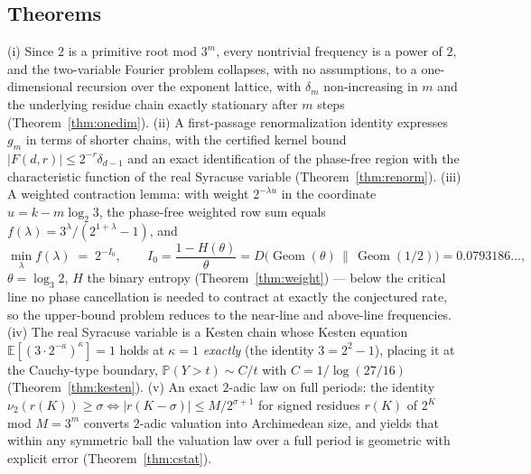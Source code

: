 \documentclass[11pt]{article}
\theoremstyle{definition}
\DeclareMathOperator{\Geom}{Geom}
\newcommand{\E}{\mathbb{E}}
\newcommand{\Prob}{\mathbb{P}}
\begin{document}
\subsection*{Theorems} (i) Since $2$ is a primitive root mod $3^m$, every
nontrivial frequency is a power of $2$, and the two-variable Fourier
problem collapses, with no assumptions, to a one-dimensional recursion
over the exponent lattice, with $\delta_m$ non-increasing in $m$ and the
underlying residue chain exactly stationary after $m$ steps
(Theorem~\ref{thm:onedim}). (ii) A first-passage renormalization identity
expresses $g_m$ in terms of shorter chains, with the certified kernel
bound $|F(d,r)|\le 2^{-r}\delta_{d-1}$ and an exact identification of the
phase-free region with the characteristic function of the real Syracuse
variable (Theorem~\ref{thm:renorm}). (iii) A weighted contraction lemma:
with weight $2^{-\lambda u}$ in the coordinate $u=k-m\log_2 3$, the
phase-free weighted row sum equals $f(\lambda)=3^{\lambda}/(2^{1+\lambda}-1)$,
and
\[
\min_{\lambda}f(\lambda)\;=\;2^{-I_0},\qquad
I_0=\frac{1-H(\theta)}{\theta}=D\bigl(\Geom(\theta)\,\|\,\Geom(1/2)\bigr)
=0.0793186\ldots,
\]
$\theta=\log_3 2$, $H$ the binary entropy (Theorem~\ref{thm:weight}) ---
below the critical line no phase cancellation is needed to contract at
exactly the conjectured rate, so the upper-bound problem reduces to the
near-line and above-line frequencies. (iv) The real Syracuse variable is a
Kesten chain whose Kesten equation $\E[(3\cdot 2^{-a})^{\kappa}]=1$ holds
at $\kappa=1$ \emph{exactly} (the identity $3=2^2-1$), placing it at the
Cauchy-type boundary, $\Prob(Y>t)\sim C/t$ with $C=1/\log(27/16)$
(Theorem~\ref{thm:kesten}). (v) An exact $2$-adic law on full periods: the
identity $\nu_2(r(K))\ge\sigma\iff |r(K-\sigma)|\le M/2^{\sigma+1}$ for
signed residues $r(K)$ of $2^K$ mod $M=3^m$ converts $2$-adic valuation
into Archimedean size, and yields that within any symmetric ball the
valuation law over a full period is geometric with explicit error
(Theorem~\ref{thm:cstat}).
\end{document}

